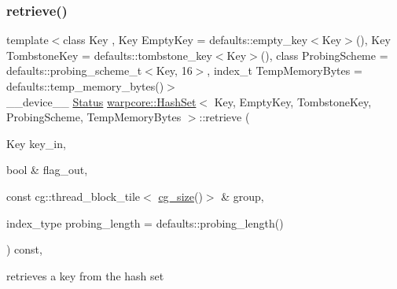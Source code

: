 \subsubsection{\texorpdfstring{retrieve()}{retrieve()}\hspace{0.1cm}{\footnotesize\ttfamily [1/2]}}
{\footnotesize\ttfamily template$<$class Key , Key Empty\+Key = defaults\+::empty\+\_\+key$<$\+Key$>$(), Key Tombstone\+Key = defaults\+::tombstone\+\_\+key$<$\+Key$>$(), class Probing\+Scheme  = defaults\+::probing\+\_\+scheme\+\_\+t$<$\+Key, 16$>$, index\+\_\+t Temp\+Memory\+Bytes = defaults\+::temp\+\_\+memory\+\_\+bytes()$>$ \\
\+\_\+\+\_\+device\+\_\+\+\_\+ \hyperlink{classwarpcore_1_1Status}{Status} \hyperlink{classwarpcore_1_1HashSet}{warpcore\+::\+Hash\+Set}$<$ Key, Empty\+Key, Tombstone\+Key, Probing\+Scheme, Temp\+Memory\+Bytes $>$\+::retrieve (\begin{DoxyParamCaption}\item[{Key}]{key\+\_\+in,  }\item[{bool \&}]{flag\+\_\+out,  }\item[{const cg\+::thread\+\_\+block\+\_\+tile$<$ \hyperlink{classwarpcore_1_1HashSet_a0906259ae0be4a4f6f9ba74b4874e542}{cg\+\_\+size}()$>$ \&}]{group,  }\item[{index\+\_\+type}]{probing\+\_\+length = {\ttfamily defaults\+:\+:probing\+\_\+length()} }\end{DoxyParamCaption}) const\hspace{0.3cm}{\ttfamily [inline]}, {\ttfamily [noexcept]}}



retrieves a key from the hash set 


